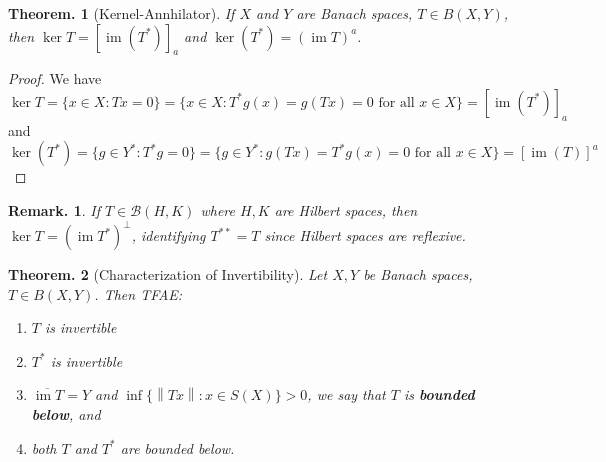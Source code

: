 \documentclass[11pt, a4paper]{memoir}
\newcommand{\norm}[1]{\ensuremath{\left\lVert#1\right\rVert}}
\theoremstyle{change}
\newtheorem{theorem}{Theorem.}[section]
\theoremstyle{plain}
\theoremstyle{nonumberplain}
\newtheorem{remark}{Remark.}
\newtheorem{proof}{Proof}
\DeclareMathOperator{\im}{im}
\numberwithin{equation}{section}
\begin{document}
\begin{theorem}[Kernel-Annhilator]
    If $X$ and $Y$ are Banach spaces, $T\in B(X,Y)$, then $\ker T=[\im(T^*)]_a$ and $\ker(T^*)=(\im T)^a$.
\end{theorem}
\begin{proof}
    We have
    \begin{equation*}
        \ker T = \{x\in X:Tx=0\}=\{x\in X:T^*g(x)=g(Tx)=0\text{ for all }x\in X\}=[\im(T^*)]_a
    \end{equation*}
    and
    \begin{equation*}
        \ker(T^*)= \{g\in Y^*:T^*g=0\}=\{g\in Y^*:g(Tx)=T^*g(x)=0\text{ for all }x\in X\}=[\im(T)]^a
    \end{equation*}
\end{proof}
\begin{remark}
    If $T\in \mathcal{B}(H,K)$ where $H,K$ are Hilbert spaces, then $\ker T=(\im T^*)^\perp$, identifying $T^{**}=T$ since Hilbert spaces are reflexive.
\end{remark}
\begin{theorem}[Characterization of Invertibility]
    Let $X,Y$ be Banach spaces, $T\in B(X,Y)$.
    Then TFAE:
    \begin{enumerate}[nl,r]
        \item $T$ is invertible
        \item $T^*$ is invertible
        \item $\overline{\im T}=Y$ and $\inf\{\norm{Tx}:x\in S(X)\}>0$, we say that $T$ is \textbf{bounded below}, and
        \item both $T$ and $T^*$ are bounded below.
    \end{enumerate}
\end{theorem}
\end{document}
